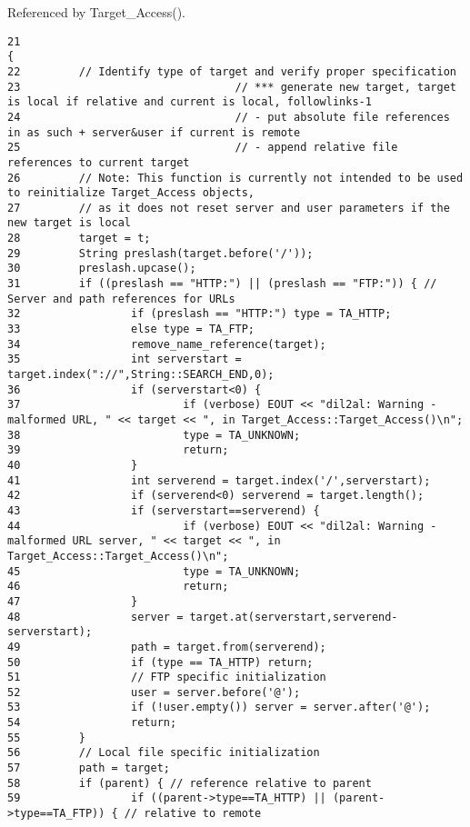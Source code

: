 Referenced by Target\_\-Access().



\footnotesize\begin{verbatim}21                                                                                   {
22         // Identify type of target and verify proper specification
23                                 // *** generate new target, target is local if relative and current is local, followlinks-1
24                                 // - put absolute file references in as such + server&user if current is remote
25                                 // - append relative file references to current target
26         // Note: This function is currently not intended to be used to reinitialize Target_Access objects,
27         // as it does not reset server and user parameters if the new target is local
28         target = t;
29         String preslash(target.before('/'));
30         preslash.upcase();
31         if ((preslash == "HTTP:") || (preslash == "FTP:")) { // Server and path references for URLs
32                 if (preslash == "HTTP:") type = TA_HTTP;
33                 else type = TA_FTP;
34                 remove_name_reference(target);
35                 int serverstart = target.index("://",String::SEARCH_END,0);
36                 if (serverstart<0) {
37                         if (verbose) EOUT << "dil2al: Warning - malformed URL, " << target << ", in Target_Access::Target_Access()\n";
38                         type = TA_UNKNOWN;
39                         return;
40                 }
41                 int serverend = target.index('/',serverstart);
42                 if (serverend<0) serverend = target.length();
43                 if (serverstart==serverend) {
44                         if (verbose) EOUT << "dil2al: Warning - malformed URL server, " << target << ", in Target_Access::Target_Access()\n";
45                         type = TA_UNKNOWN;
46                         return;
47                 }
48                 server = target.at(serverstart,serverend-serverstart);
49                 path = target.from(serverend);
50                 if (type == TA_HTTP) return;
51                 // FTP specific initialization
52                 user = server.before('@');
53                 if (!user.empty()) server = server.after('@');
54                 return;
55         }
56         // Local file specific initialization
57         path = target;
58         if (parent) { // reference relative to parent
59                 if ((parent->type==TA_HTTP) || (parent->type==TA_FTP)) { // relative to remote

\end{verbatim}
